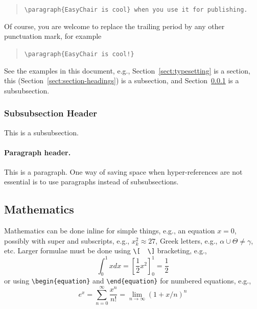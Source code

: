 \documentclass{imav2013}
\begin{document}
\begin{quote}
\verb|\paragraph{EasyChair is cool} when you use it for publishing.| 
\end{quote}
Of course, you are welcome to replace the trailing period by any other
punctuation mark, for example 

\begin{quote}
\verb|\paragraph{EasyChair is cool!}|
\end{quote}

See the examples in this document, e.g.,
Section~\ref{sect:typesetting} is a section, this 
(Section~\ref{sect:section-headings}) is a subsection, and
Section~\ref{sect:subsubsection-headings} is a subsubsection.

\subsubsection{Subsubsection Header}
\label{sect:subsubsection-headings}

This is a subsubsection. 

\paragraph{Paragraph header.}

This is a paragraph. 
One way of saving space when hyper-references are not essential is to 
use paragraphs instead of subsubsections.

\subsection{Mathematics}
\label{sect:mathematics}

Mathematics can be done inline for simple things, e.g., an equation
$x = 0$, possibly with super and subscripts, e.g., $x^2_k \approx 27$,
Greek letters, e.g., $\alpha \cup \Theta \ne \gamma$, etc.
Larger formulae must be done using {\tt \verb|\|[}~~{\tt \verb|\|]}
bracketing, e.g.,
\[
\int_{0}^{1} x dx = \left[ \frac{1}{2}x^2 \right]_{0}^{1} = \frac{1}{2}
\]
or using {\tt \verb|\|begin\{equation\}} and {\tt \verb|\|end\{equation\}} for
numbered equations, e.g.,
\begin{equation}
e^x = \sum_{n=0}^\infty \frac{x^n}{n!} = \lim_{n\rightarrow\infty} (1+x/n)^n
\end{equation}
\end{document}

